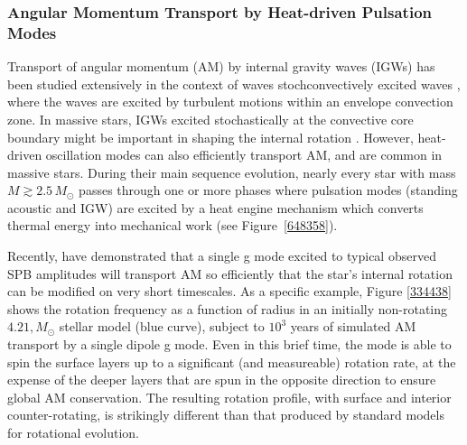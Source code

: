 
\subsubsection{Angular Momentum Transport by Heat-driven Pulsation Modes}

Transport of angular momentum (AM) by internal gravity waves (IGWs) has been studied extensively in the context of waves stochconvectively excited waves \citep[e.g.,][]{Schatzman:1993,Kumar:1997,Zahn:1997,Talon:2002,Talon:2005,Rogers:2008aa}, where the waves are excited by turbulent motions within an envelope convection zone. In massive stars, IGWs excited stochastically at the convective core boundary might be important in shaping the internal rotation \citep[e.g.][]{Rogers:2013,Lee:2014,Rogers:2015}. However, heat-driven oscillation modes can also efficiently transport AM, and are common in massive stars. During their main sequence evolution, nearly every star with mass $M \gtrsim 2.5\,M_{\odot}$ passes through one or more phases where pulsation modes (standing acoustic and IGW) are excited by a heat engine mechanism which converts thermal energy into mechanical work (see Figure~\ref{648358}).


Recently, \citet{Townsend:2017} have demonstrated that a single g mode excited to typical observed SPB amplitudes will transport AM so efficiently that the star's internal rotation can be modified on very short timescales. As a specific example, Figure \ref{334438} shows the rotation frequency as a function of radius in an initially non-rotating $4.21,M_{\odot}$ stellar model (blue curve), subject to $10^3$ years of simulated AM transport by a single dipole g mode. Even in this brief time, the mode is able to spin the surface layers up to a significant (and measureable) rotation rate, at the expense of the deeper layers that are spun in the opposite direction to ensure global AM conservation. The resulting rotation profile, with surface and interior counter-rotating, is strikingly different than that produced by standard models for rotational evolution.


